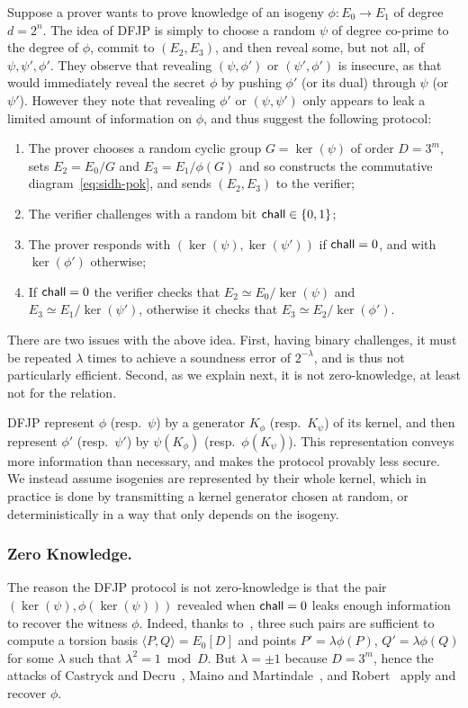 Suppose a prover wants to prove knowledge of an isogeny $\phi : E_0 \to E_1$ of degree $d = 2^n$.
The idea of DFJP is simply to choose a random $\psi$ of degree co-prime to the degree of $\phi$, commit to $(E_2,E_3)$, and then reveal some, but not all, of $\psi,\psi',\phi'$.
They observe that revealing $(\psi,\phi')$ or $(\psi',\phi')$ is insecure, as that would immediately reveal the secret $\phi$ by pushing $\phi'$ (or its dual) through $\psi$ (or $\psi'$).
However they note that revealing $\phi'$ or $(\psi,\psi')$ only appears to leak a limited amount of information on $\phi$, and thus suggest the following protocol:
\begin{enumerate}
    \item The prover chooses a random cyclic group $G = \ker(\psi)$ of order $D=3^m$, sets $E_2=E_0/G$ and $E_3 = E_1/\phi(G)$ and so constructs the commutative diagram~\eqref{eq:sidh-pok}, and sends $(E_2,E_3)$ to the verifier;
    \item The verifier challenges with a random bit $\mathsf{chall}\in\{0,1\}$;
    \item The prover responds with $(\ker(\psi),\ker(\psi'))$ if $\mathsf{chall}=0$, and with $\ker(\phi')$ otherwise;
    \item If $\mathsf{chall}=0$ the verifier checks that $E_2 \simeq E_0/\ker(\psi)$ and $E_3 \simeq E_1/\ker(\psi')$, otherwise it checks that $E_3 \simeq E_2/\ker(\phi')$.
\end{enumerate}

There are two issues with the above idea.
First, having binary challenges, it must be repeated $\lambda$ times to achieve a soundness error of $2^{-\lambda}$, and is thus not particularly efficient.
Second, as we explain next, it is not zero-knowledge, at least not for the \R[deg] relation.

\begin{remark}
    DFJP represent $\phi$ (resp.\ $\psi$) by a generator $K_\phi$ (resp.\ $K_\psi$) of its kernel, and then represent $\phi'$ (resp.\ $\psi'$) by $\psi(K_\phi)$ (resp.\ $\phi(K_\psi)$). This representation conveys more information than necessary, and makes the protocol provably less secure. We instead assume isogenies are represented by their whole kernel, which in practice is done by transmitting a kernel generator chosen at random, or deterministically in a way that only depends on the isogeny.
\end{remark}

\subsubsection{Zero Knowledge.} 
The reason the DFJP protocol is not zero-knowledge is that the pair $(\ker(\psi), \phi(\ker(\psi)))$ revealed when $\mathsf{chall} = 0$ leaks enough information to recover the witness $\phi$.
Indeed, thanks to~\cite[Lemma~1]{10.1007/978-3-030-95312-6_14}, three such pairs are sufficient to compute a torsion basis $\langle P,Q\rangle = E_0[D]$ and points $P' = \lambda\phi(P)$, $Q' = \lambda\phi(Q)$ for some $\lambda$ such that $\lambda^2 = 1 \bmod D$.
But $\lambda = \pm 1$ because $D = 3^m$, hence the attacks of Castryck and Decru~\cite{CD22}, Maino and Martindale~\cite{MM22}, and Robert~\cite{Rob22} apply and recover $\phi$.

